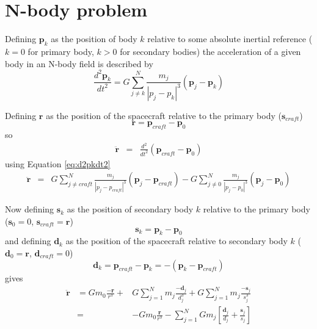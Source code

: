 \chapter{N-body problem} \label{cha:N-body-problem}

Defining $\mathbf{p}_{k}$ as the position of body $k$ relative to some absolute inertial reference ($k=0$ for primary body, $k>0$ for secondary bodies) the acceleration of a given body in an N-body field is described by 
\begin{equation}
\frac{d^{2}\mathbf{p}_{k}}{dt^{2}}=G\sum_{j\neq k}^{N}\frac{m_{j}}{\left|p_{j}-p_{k}\right|^{3}}(\mathbf{p}_{j}-\mathbf{p}_{k})\label{eq:d2pkdt2}
\end{equation}

Defining $\mathbf{r}$ as the position of the spacecraft relative to the primary body ($\mathbf{s}_{craft}$)
\begin{equation}
\mathbf{r=p}_{craft}-\mathbf{p}_{0}
\end{equation}
so
\begin{eqnarray}
\mathbf{\ddot{r}} & = & \frac{d^{2}}{dt^{2}}(\mathbf{p}_{craft}-\mathbf{p}_{0})
\end{eqnarray}
using Equation \eqref{eq:d2pkdt2}
\begin{eqnarray}
\mathbf{\ddot{r}} & = & G\sum_{j\neq craft}^{N}\frac{m_{j}}{\left|p_{j}-p_{craft}\right|^{3}}(\mathbf{p}_{j}-\mathbf{p}_{craft})-G\sum_{j\neq0}^{N}\frac{m_{j}}{\left|p_{j}-p_{0}\right|^{3}}(\mathbf{p}_{j}-\mathbf{p}_{0})
\end{eqnarray}

Now defining $\mathbf{s}_{k}$ as the position of secondary body $k$ relative to the primary body ($\mathbf{s}_{0}=0$, $\mathbf{s}_{craft}=\mathbf{r}$)
\begin{equation}
\mathbf{s}_{k}=\mathbf{p}_{k}-\mathbf{p}_{0}
\end{equation}
and defining $\mathbf{d}_{k}$ as the position of the spacecraft relative to secondary body $k$
($\mathbf{d}_{0}=\mathbf{r}$, $\mathbf{d}_{craft}=0$)
\begin{equation}
\mathbf{d}_{k}=\mathbf{p}_{craft}-\mathbf{p}_{k}=-\left(\mathbf{p}_{k}-\mathbf{p}_{craft}\right)
\end{equation}
gives
\begin{eqnarray}
\mathbf{\ddot{r}} & =Gm_{0}\frac{\mathbf{-r}}{r^{3}}+ & G\sum_{j=1}^{N}m_{j}\frac{\mathbf{-d}_{j}}{d_{j}^{3}}+G\sum_{j=1}^{N}m_{j}\frac{\mathbf{-s}_{j}}{\mbox{}s_{j}^{3}}\\
 & = & -Gm_{0}\frac{\mathbf{r}}{r^{3}}-\sum_{j=1}^{N}Gm_{j}\left[\frac{\mathbf{d}_{j}}{d_{j}}+\frac{\mathbf{s}_{j}}{s_{j}}\right]
 \end{eqnarray}

